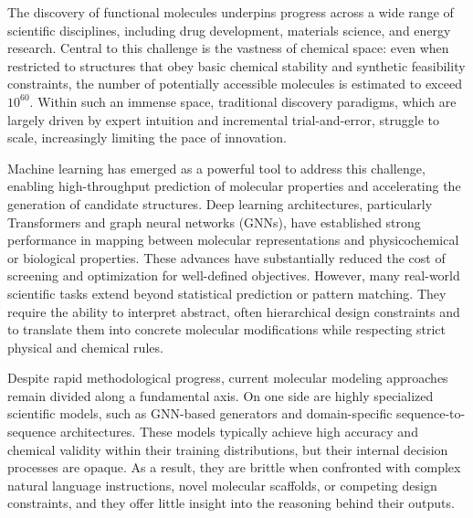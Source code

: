 \documentclass[11pt]{article}
\begin{document}
The discovery of functional molecules underpins progress across a wide range of scientific disciplines, including drug development, materials science, and energy research\cite{reymond2015chemical,vamathevan2019applications,tabor2018accelerating}. Central to this challenge is the vastness of chemical space: even when restricted to structures that obey basic chemical stability and synthetic feasibility constraints, the number of potentially accessible molecules is estimated to exceed $10^{60}$\cite{ruddigkeit2012gdb}. Within such an immense space, traditional discovery paradigms, which are largely driven by expert intuition and incremental trial-and-error, struggle to scale, increasingly limiting the pace of innovation\cite{butler2018machine,sanchez2018inverse}.

Machine learning has emerged as a powerful tool to address this challenge, enabling high-throughput prediction of molecular properties and accelerating the generation of candidate structures\cite{olivecrona2017reinvent,survey2024genai}. Deep learning architectures, particularly Transformers and graph neural networks (GNNs)\cite{gilmer2017mpnn,jensen2019gnn,you2022graph}, have established strong performance in mapping between molecular representations and physicochemical or biological properties\cite{stokes2020deep,schuster2019transfer}. These advances have substantially reduced the cost of screening and optimization for well-defined objectives. However, many real-world scientific tasks extend beyond statistical prediction or pattern matching. They require the ability to interpret abstract, often hierarchical design constraints and to translate them into concrete molecular modifications while respecting strict physical and chemical rules\cite{bilodeau2022generative,fang2023mol,m2024augmenting}.

Despite rapid methodological progress, current molecular modeling approaches remain divided along a fundamental axis\cite{survey2024llmchem}. On one side are highly specialized scientific models, such as GNN-based generators and domain-specific sequence-to-sequence architectures\cite{edwards2022molt5,schwaller2019molecular,chithrananda2020chemberta,grechishnikova2021transformer}. These models typically achieve high accuracy and chemical validity within their training distributions, but their internal decision processes are opaque. As a result, they are brittle when confronted with complex natural language instructions, novel molecular scaffolds, or competing design constraints, and they offer little insight into the reasoning behind their outputs.
\end{document}
